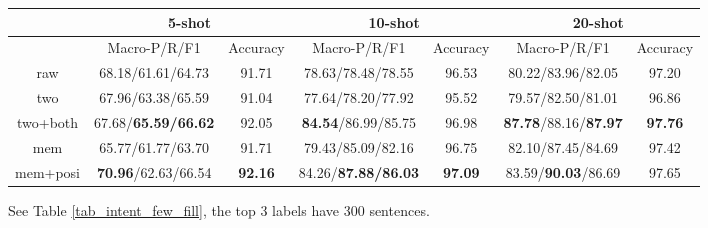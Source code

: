 \begin{table*}
\setlength{\tabcolsep}{0.23em}
\centering
\small{
\begin{tabular}{|c|c|c|c|c|c|c|}

\hline
  & \multicolumn{2}{|c|}{5-shot} & \multicolumn{2}{|c|}{10-shot} & \multicolumn{2}{|c|}{20-shot}  \\
 \hline
  & Macro-P/R/F1 & Accuracy & Macro-P/R/F1 & Accuracy  & Macro-P/R/F1 & Accuracy   \\
\hline
raw & 68.18/61.61/64.73 & 91.71 & 78.63/78.48/78.55 & 96.53 & 80.22/83.96/82.05 & 97.20 \\
\hline
two & 67.96/63.38/65.59 & 91.04 & 77.64/78.20/77.92 & 95.52 & 79.57/82.50/81.01 & 96.86 \\
\hline
two+both & 67.68/\textbf{65.59/66.62} & 92.05 & \textbf{84.54}/86.99/85.75 & 96.98 & \textbf{87.78}/88.16/\textbf{87.97} & \textbf{97.76} \\
\hline
mem & 65.77/61.77/63.70 & 91.71 & 79.43/85.09/82.16 & 96.75 & 82.10/87.45/84.69 & 97.42 \\
\hline
mem+posi & \textbf{70.96}/62.63/66.54 & \textbf{92.16} & 84.26/\textbf{87.88/86.03} & \textbf{97.09} & 83.59/\textbf{90.03}/86.69 & 97.65 \\
\hline

\end{tabular}
}
\caption{Intent Detection Result on Few-Shot Data with the Top 3 Intents Having 300 Sentences.}
\label{tab_intent_few_fill}
\end{table*}
See Table \ref{tab_intent_few_fill}, the top 3 labels have 300 sentences.







